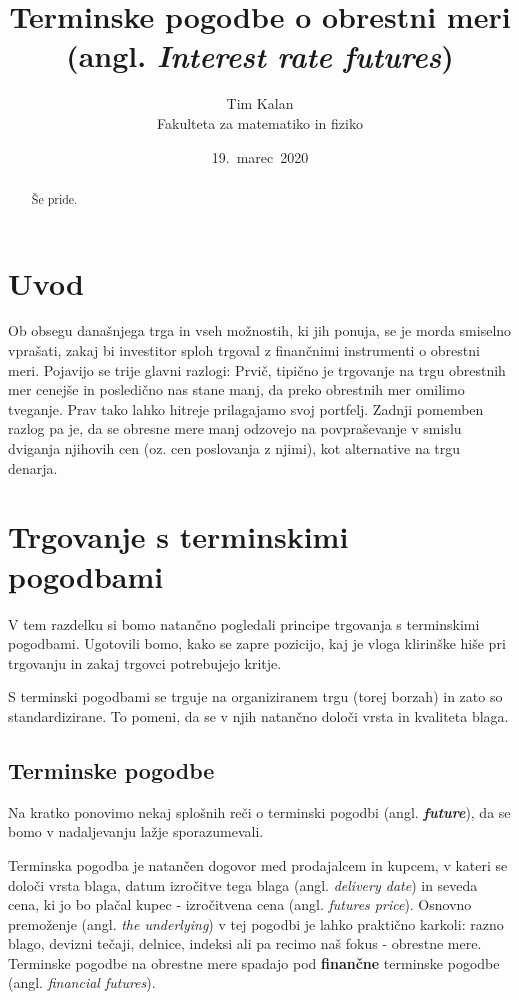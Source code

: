 \documentclass[a4paper, 12pt]{article}
\author{Tim Kalan \\ Fakulteta za matematiko in fiziko}
\title{
    Terminske pogodbe o obrestni meri \\ 
    \large (angl. \textit{Interest rate futures})}
\date{19.\ marec\ 2020} %
\begin{document}
\maketitle
\pagebreak
\tableofcontents
\pagebreak

\begin{abstract}
    Še pride.
\end{abstract}

\section{Uvod}
Ob obsegu današnjega trga in vseh možnostih, ki jih ponuja, se je morda smiselno vprašati,
zakaj bi investitor sploh trgoval z finančnimi instrumenti o obrestni meri. Pojavijo se trije
glavni razlogi: Prvič, tipično je trgovanje na trgu obrestnih mer cenejše in posledično nas 
stane manj, da preko obrestnih mer omilimo tveganje. Prav tako lahko hitreje prilagajamo svoj 
portfelj. Zadnji pomemben razlog pa je, da se obresne mere manj odzovejo na povpraševanje v 
smislu dviganja njihovih cen (oz. cen poslovanja z njimi), kot alternative na trgu denarja.

\section{Trgovanje s terminskimi pogodbami}
V tem razdelku si bomo natančno pogledali principe trgovanja s terminskimi pogodbami. Ugotovili
bomo, kako se zapre pozicijo, kaj je vloga klirinške hiše pri trgovanju in zakaj trgovci potrebujejo
kritje.

S terminski pogodbami se trguje na organiziranem trgu (torej borzah) in zato so standardizirane. 
To pomeni, da se v njih natančno določi vrsta in kvaliteta blaga.

\subsection{Terminske pogodbe}
Na kratko ponovimo nekaj splošnih reči o terminski pogodbi (angl. \textit{\textbf{future}}), da se 
bomo v nadaljevanju lažje sporazumevali.

Terminska pogodba je natančen dogovor med prodajalcem in kupcem, v kateri se določi vrsta
blaga, datum izročitve tega blaga (angl. \textit{delivery date}) in seveda cena, 
ki jo bo plačal kupec - izročitvena cena (angl. \textit{futures price}). 
Osnovno premoženje (angl. \textit{the underlying}) v tej pogodbi je lahko praktično karkoli: 
razno blago, devizni tečaji, delnice, indeksi ali pa recimo naš fokus - obrestne mere. 
Terminske pogodbe na obrestne mere spadajo pod \textbf{finančne} terminske pogodbe 
(angl. \textit{financial futures}).
\end{document}

